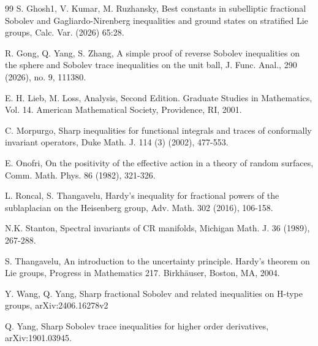 \documentclass[12pt,reqno]{amsart}%
\theoremstyle{plain}
\numberwithin{equation}{section}
\begin{document}
\begin{thebibliography}{99}
S. Ghosh1,  V. Kumar, M. Ruzhansky, Best constants in subelliptic fractional Sobolev and
Gagliardo-Nirenberg inequalities and ground states on
stratified Lie groups, Calc. Var. (2026) 65:28.

 R. Gong, Q. Yang, S. Zhang, A simple proof of reverse Sobolev inequalities on the sphere and  Sobolev trace inequalities on the unit ball, J. Func. Anal.,
290 (2026), no. 9, 111380.










E. H. Lieb,  M. Loss, Analysis,  Second Edition.   Graduate Studies in Mathematics, Vol. 14.
American Mathematical Society, Providence, RI, 2001.



 C. Morpurgo, Sharp inequalities for functional integrals and traces of conformally invariant operators, Duke
Math. J. 114 (3) (2002),  477-553.



E. Onofri, On the positivity of the effective action in a theory of random surfaces,
Comm. Math. Phys. 86 (1982), 321-326.

L. Roncal, S. Thangavelu, Hardy's inequality for fractional powers of the sublaplacian on the Heisenberg group, Adv. Math. 302 (2016), 106-158.



   N.K. Stanton, Spectral invariants of CR manifolds, Michigan Math. J. 36 (1989), 267-288.



 S. Thangavelu, An introduction to the uncertainty principle. Hardy's theorem on Lie groups,  Progress in Mathematics 217. Birkh\"auser, Boston, MA, 2004.

 Y. Wang, Q. Yang,  Sharp fractional Sobolev and related inequalities on H-type groups,  arXiv:2406.16278v2

 Q. Yang,  Sharp Sobolev trace inequalities for higher order derivatives, arXiv:1901.03945.



\end{thebibliography}
\end{document}
